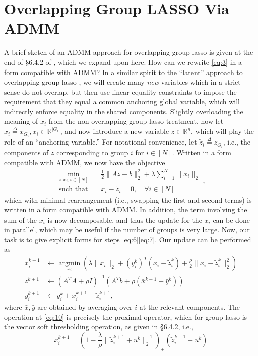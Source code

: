\documentclass{article}
\begin{document}
\section{Overlapping Group LASSO Via ADMM}
\label{sec:group-lasso-via}
A brief sketch of an ADMM approach for overlapping group lasso is given at the end of \S 6.4.2 of \cite{boyd_distributed_2011}, which we expand upon here.
How can we rewrite \eqref{eq:3} in a form compatible with ADMM?
In a similar spirit to the ``latent'' approach to overlapping group lasso \cite{jacob_group_2009,obozinski_group_2011}, we will create many \emph{new} variables which in a strict sense do not overlap, but then use linear equality constraints to impose the requirement that they equal a common anchoring global variable, which will indirectly enforce equality in the shared components.
Slightly overloading the meaning of $x_i$ from the non-overlapping group lasso treatment, now let $x_i \overset{\Delta}{=} x_{G_i}, x_i \in \mathbb{R}^{\left| G_i \right|}$, and now introduce a new variable $z \in \mathbb{R}^n$, which will play the role of an ``anchoring variable.''
For notational convenience, let $\tilde{z}_i \overset{\Delta}{=} z_{G_i}$, i.e., the components of $z$ corresponding to group $i$ for $i \in [N]$.
Written in a form compatible with ADMM, we now have the objective
\begin{equation}
  \begin{aligned}
  \label{eq:9}
  \operatorname*{min}_{z,x_i, i \in [N]} \quad &\frac{1}{2} \lVert Az - b \rVert_2^2 + \lambda \sum_{i=1}^N \lVert x_i \rVert_2 \\
  \text{such that} \quad & x_i - \tilde{z}_i = 0, \quad \forall i \in [N]
  \end{aligned},
\end{equation}
which with minimal rearrangement (i.e., swapping the first and second terms) is written in a form compatible with ADMM.
In addition, the term involving the sum of the $x_i$ is now decomposable, and thus the update for the $x_i$ can be done in parallel, which may be useful if the number of groups is very large.
Now, our task is to give explicit forms for steps \eqref{eq:6}\eqref{eq:7}.
Our update can be performed as
\begin{align}
  \label{eq:10}
  x_i^{k+1} &\leftarrow \operatorname*{argmin}_{x_i} (\lambda \lVert x_i \rVert_2 + \left( y_i^k \right)^T(x_i - \tilde{z}_i^k) + \frac{\rho}{2} \lVert x_i - \tilde{z}_i^k \rVert_2^2) \\
  \label{eq:11}
  z^{k+1} &\leftarrow (A^TA + \rho I)^{-1}(A^T b + \rho(\bar{x}^{k+1} - \bar{y}^k)) \\
  \label{eq:12}
  y_i^{k+1} &\leftarrow y_i^k + x_i^{k+1} - \tilde{z}_i^{k+1},
\end{align}
where $\bar{x}, \bar{y}$ are obtained by averaging over $i$ at the relevant components.
The operation at \eqref{eq:10} is precisely the proximal operator, which for group lasso is the vector soft thresholding operation, as given in \S 6.4.2, i.e.,
\begin{equation}
  \label{eq:13}
  x_i^{k+1} = (1 - \frac{\lambda}{\rho} \lVert \tilde{z}_i^{k+1} + u^k \rVert_2^{-1})_+ (\tilde{z}_i^{k+1} + u^k)
\end{equation}
\end{document}
